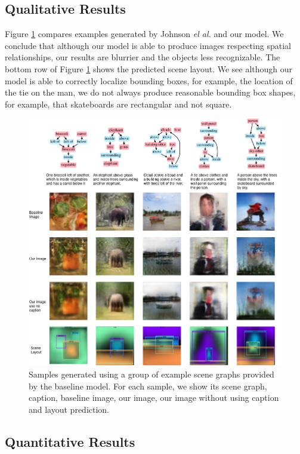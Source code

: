\documentclass{article}
\begin{document}
\subsection{Qualitative Results}
Figure \ref{fig:example context} compares examples generated by Johnson \textit{el al.} and our model. We conclude that although our model is able to produce images respecting spatial relationships, our results are blurrier and the objects less recognizable. The bottom row of Figure \ref{fig:example context} shows the predicted scene layout. We see although our model is able to correctly localize bounding boxes, for example, the location of the tie on the man, we do not always produce reasonable bounding box shapes, for example, that skateboards are rectangular and not square.
\begin{figure}[]
    \centering
    \includegraphics[width=\textwidth]{Figure5.png}
    \caption{Samples generated using a group of example scene graphs provided by the baseline model. For each sample, we show its scene graph, caption, baseline image, our image, our image without using caption and layout prediction.}
    \label{fig:example context}
\end{figure}

\subsection{Quantitative Results}
\end{document}
